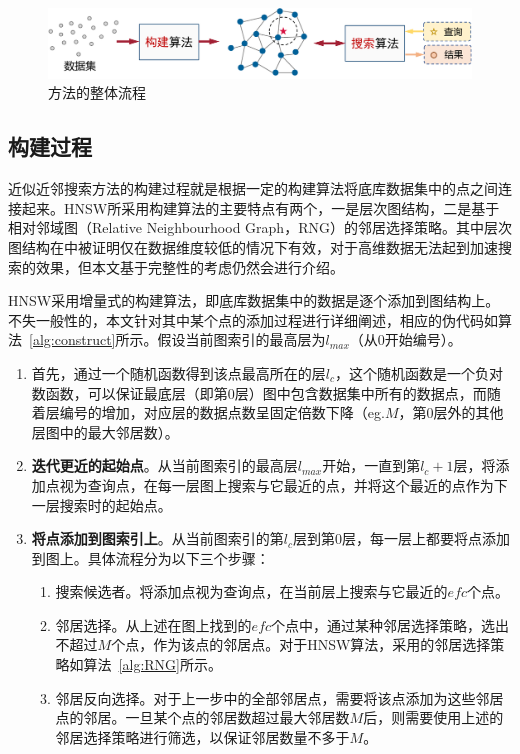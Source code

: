 \begin{figure}
  \centering
  \includegraphics[width=0.9\linewidth]{figures/Background/ganns.pdf}
  \caption{\ganns 方法的整体流程}
  \label{fig:ganns}
\end{figure}


\subsection{构建过程}
近似近邻搜索方法的构建过程就是根据一定的构建算法将底库数据集中的点之间连接起来。HNSW所采用构建算法的主要特点有两个，一是层次图结构，二是基于相对邻域图\cite{rng-1980}（Relative Neighbourhood Graph，RNG）的邻居选择策略。其中层次图结构在中被证明仅在数据维度较低的情况下有效，对于高维数据无法起到加速搜索的效果，但本文基于完整性的考虑仍然会进行介绍。

HNSW采用增量式的构建算法，即底库数据集中的数据是逐个添加到图结构上。不失一般性的，本文针对其中某个点的添加过程进行详细阐述，相应的伪代码如算法~\ref{alg:construct}所示。假设当前图索引的最高层为$l_{max}$（从0开始编号）。
\begin{enumerate}
    \item 首先，通过一个随机函数得到该点最高所在的层$l_c$，这个随机函数是一个负对数函数，可以保证最底层（即第0层）图中包含数据集中所有的数据点，而随着层编号的增加，对应层的数据点数呈固定倍数下降（eg.$M$，第0层外的其他层图中的最大邻居数）。
    \item \textbf{迭代更近的起始点}。从当前图索引的最高层$l_{max}$开始，一直到第$l_c+1$层，将添加点视为查询点，在每一层图上搜索与它最近的点，并将这个最近的点作为下一层搜索时的起始点。
    \item \textbf{将点添加到图索引上}。从当前图索引的第$l_c$层到第0层，每一层上都要将点添加到图上。具体流程分为以下三个步骤： 
    \begin{enumerate}
        \item 搜索候选者。将添加点视为查询点，在当前层上搜索与它最近的$efc$个点。
        \item 邻居选择。从上述在图上找到的$efc$个点中，通过某种邻居选择策略，选出不超过$M$个点，作为该点的邻居点。对于HNSW算法，采用的邻居选择策略如算法~\ref{alg:RNG}所示。
        \item 邻居反向选择。对于上一步中的全部邻居点，需要将该点添加为这些邻居点的邻居。一旦某个点的邻居数超过最大邻居数$M$后，则需要使用上述的邻居选择策略进行筛选，以保证邻居数量不多于$M$。
    \end{enumerate}
\end{enumerate}


